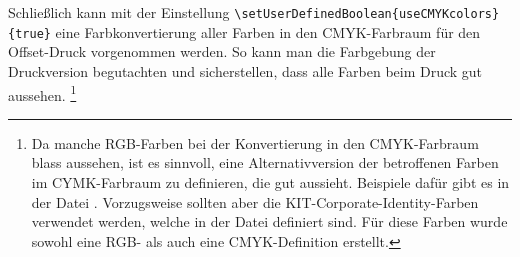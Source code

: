 Schließlich kann mit der Einstellung
\lstinline|\setUserDefinedBoolean{useCMYKcolors}{true}|
eine Farbkonvertierung aller Farben in den CMYK-Farbraum für den Offset-Druck vorgenommen werden.
So kann man die Farbgebung der Druckversion begutachten und sicherstellen, dass alle Farben beim Druck gut aussehen.%
\footnote{Da manche RGB-Farben bei der Konvertierung in den CMYK-Farbraum blass aussehen,
ist es sinnvoll, eine Alternativversion der betroffenen Farben im CYMK-Farbraum zu definieren,
die gut aussieht.
Beispiele dafür gibt es in der Datei .
Vorzugsweise sollten aber die KIT-Corporate-Identity-Farben verwendet werden,
welche in der Datei  definiert sind.
Für diese Farben wurde sowohl eine RGB- als auch eine CMYK-Definition erstellt.}
